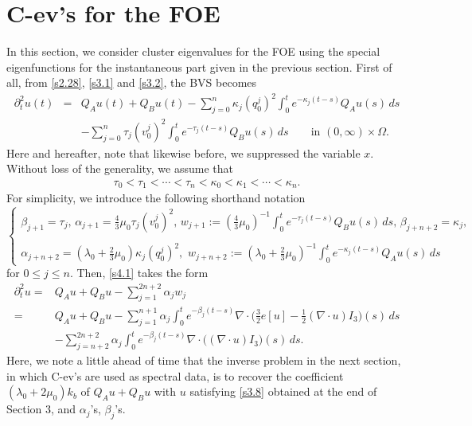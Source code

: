 \documentclass[a4paper,12pt]{article}
\newtheorem{a priori condition}[Th]{A priori condition}
\begin{document}
\section{C-ev's for the FOE }
\setcounter{equation}{0}

In this section, we consider cluster eigenvalues for the FOE using the special eigenfunctions for the instantaneous part given in the previous section. First of all, from \eqref{s2.28}, \eqref{s3.1} and \eqref{s3.2}, the BVS becomes
\begin{equation}\label{s4.1}
\begin{array}{rcl}
\partial_t^2 u(t) &=&Q_Au(t)+Q_Bu(t)-\displaystyle\sum_{j=0}^n \kappa_j(q_0^j)^2\int_0^t e^{-\kappa_j(t-s)}Q_Au(s)\,ds\\
&&-\displaystyle\sum_{j=0}^n \tau_j(v_0^j)^2\int_0^t e^{-\tau_j(t-s)}Q_Bu(s)\,ds\qquad\text{in $(0,\infty)\times\Omega$}.
\end{array}
\end{equation}
Here and hereafter, note that likewise before, we suppressed the variable $x$.
Without loss of the generality, we assume that
\begin{equation}\label{s4.2}
\begin{aligned}
\tau_0<\tau_1<\cdots<\tau_n<\kappa_0<\kappa_1<\cdots<\kappa_n.
\end{aligned}
\end{equation}
For simplicity, we introduce the following shorthand notation 
\begin{equation}\label{s4.3}
\left\{
\begin{array}{ll}\beta_{j+1}=\tau_j,\, \alpha_{j+1}=\frac{4}{3}\mu_0\tau_j(v_0^j)^2,\,  w_{j+1}:=(\frac{4}{3}\mu_0)^{-1}\int_0^t e^{-\tau_j(t-s)}Q_Bu(s)\,ds,\,\beta_{j+n+2}=\kappa_j,
 \\
\\
 \alpha_{j+n+2}=(\lambda_0+\frac{2}{3}\mu_0)\kappa_j(q_0^j)^2, \,\,w_{j+n+2}:=(\lambda_0+\frac{2}{3}\mu_0)^{-1}\int_0^t e^{-\kappa_j(t-s)}Q_Au(s)\,ds
\end{array}
\right.
\end{equation}  
for $0\leq j\leq n$. Then, \eqref{s4.1} takes the form
\begin{equation}\label{s4.4}
\begin{aligned}
\partial_t^2 u=&Q_A u +Q_B u-  \sum_{j=1}^{2n+2} \alpha_jw_j\\
=&Q_A u +Q_B u- \sum_{j=1}^{n+1} \alpha_j\int_0^t e^{-\beta_j(t-s)}\nabla\cdot \big(\frac{3}{2}e[u]-\frac{1}{2}(\nabla\cdot u) I_3\big)(s)\,ds\\
&-\sum_{j=n+2}^{2n+2} \alpha_j\int_0^t e^{-\beta_j(t-s)}\nabla\cdot \big((\nabla\cdot u) I_3\big)(s)\,ds.
\end{aligned}
\end{equation}
Here, we note a little ahead of time that the inverse problem in the next section, in which C-ev's are used as spectral data, is to recover the coefficient $(\lambda_0+2\mu_0)k_b$ of $Q_A u+Q_B u$ with $u$ satisfying \eqref{s3.8} obtained at the end of Section 3, and $\alpha_j$'s, $\beta_j$'s.
\end{document}
